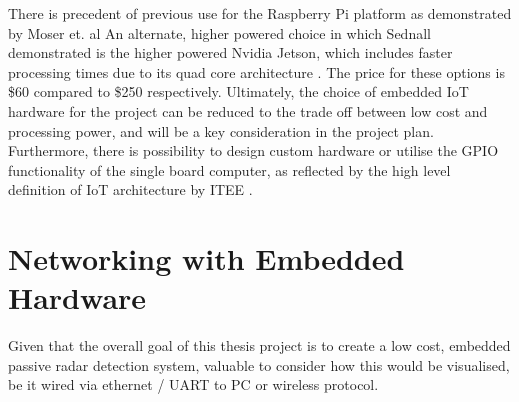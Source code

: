 \par \vspace{0.5cm} 
\noindent There is precedent of previous use for the Raspberry Pi platform as demonstrated by Moser et. al \cite{IOTpassiveRadar} An alternate, higher powered choice in which Sednall demonstrated is the higher powered Nvidia Jetson, which includes faster processing times due to its quad core architecture \cite{FMlowCost}. The price for these options is \$60 compared to \$250 respectively. Ultimately, the choice of embedded IoT hardware for the project can be reduced to the trade off between low cost and processing power, and will be a key consideration in the project plan. Furthermore, there is possibility to design custom hardware or utilise the GPIO functionality of the single board computer, as reflected by the high level definition of IoT architecture by ITEE \cite{IoTdefinition}.

\section{Networking with Embedded Hardware}

Given that the overall goal of this thesis project is to create a low cost, embedded passive radar detection system, valuable to consider how this would be visualised, be it wired via ethernet / UART to PC or wireless protocol. 





